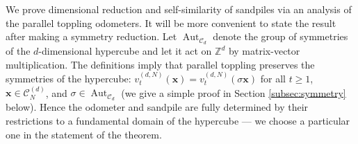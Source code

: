 \documentclass[12pt]{amsart}
\newcommand{\Z}{\mathbb{Z}}
\begin{document}
	
	We prove dimensional reduction and self-similarity of sandpiles
	via an analysis of the parallel toppling odometers.  It will be more convenient to state the result after making a symmetry reduction. 
	 Let $\operatorname{Aut}_{\mathcal{C}_d}$ denote the group of symmetries of the $d$-dimensional hypercube and let it act on $\Z^d$ by matrix-vector multiplication.
	 The definitions imply that parallel toppling preserves the symmetries of the hypercube: 	$v_t^{(d,N)}(\mathbf{x}) = v_t^{(d,N)}( \sigma \mathbf{x})$ for all $t \geq 1$, $\mathbf{x} \in \mathcal{C}_N^{(d)}$, and $ \sigma \in \operatorname{Aut}_{\mathcal{C}_d}$ (we give a simple proof in Section \ref{subsec:symmetry} below).
	 Hence the odometer and sandpile are fully determined by their restrictions to
	a fundamental domain of the hypercube --- we choose a particular one in the statement of the theorem. 
	
\end{document}
